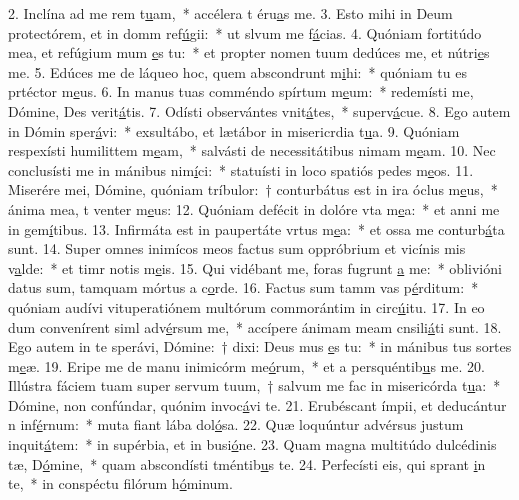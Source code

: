 2. Inclína ad me rem t\uline{u}am,~* accélera t éru\uline{a}s me.
3. Esto mihi in Deum protectórem, et in domm ref\uline{ú}gii:~* ut slvum me f\uline{á}cias.
4. Quóniam fortitúdo mea, et refúgium mum \uline{e}s tu:~* et propter nomen tuum dedúces me, et nútri\uline{e}s me.
5. Edúces me de láqueo hoc, quem abscondrunt m\uline{i}hi:~* quóniam tu es prtéctor m\uline{e}us.
6. In manus tuas comméndo spírtum m\uline{e}um:~* redemísti me, Dómine, Des verit\uline{á}tis.
7. Odísti observántes vnit\uline{á}tes,~* superv\uline{á}cue.
8. Ego autem in Dómin sper\uline{á}vi:~* exsultábo, et lætábor in misericrdia t\uline{u}a.
9. Quóniam respexísti humilittem m\uline{e}am,~* salvásti de necessitátibus nimam m\uline{e}am.
10. Nec conclusísti me in mánibus nim\uline{í}ci:~* statuísti in loco spatiós pedes m\uline{e}os.
11. Miserére mei, Dómine, quóniam tríbulor:~† conturbátus est in ira óclus m\uline{e}us,~* ánima mea, t venter m\uline{e}us:
12. Quóniam defécit in dolóre vta m\uline{e}a:~* et anni me in gem\uline{í}tibus.
13. Infirmáta est in paupertáte vrtus m\uline{e}a:~* et ossa me conturb\uline{á}ta sunt.
14. Super omnes inimícos meos factus sum oppróbrium et vicínis mis v\uline{a}lde:~* et timr notis m\uline{e}is.
15. Qui vidébant me, foras fugrunt \uline{a} me:~* oblivióni datus sum, tamquam mórtus a c\uline{o}rde.
16. Factus sum tamm vas p\uline{é}rditum:~* quóniam audívi vituperatiónem multórum commorántim in circ\uline{ú}itu.
17. In eo dum convenírent siml adv\uline{é}rsum me,~* accípere ánimam meam cnsili\uline{á}ti sunt.
18. Ego autem in te sperávi, Dómine:~† dixi: Deus mus \uline{e}s tu:~* in mánibus tus sortes m\uline{e}æ.
19. Eripe me de manu inimicórm me\uline{ó}rum,~* et a persquéntib\uline{u}s me.
20. Illústra fáciem tuam super servum tuum,~† salvum me fac in misericórda t\uline{u}a:~* Dómine, non confúndar, quónim invoc\uline{á}vi te.
21. Erubéscant ímpii, et deducántur n inf\uline{é}rnum:~* muta fiant lába dol\uline{ó}sa.
22. Quæ loquúntur advérsus justum inquit\uline{á}tem:~* in supérbia, et in busi\uline{ó}ne.
23. Quam magna multitúdo dulcédinis tæ, D\uline{ó}mine,~* quam abscondísti tméntib\uline{u}s te.
24. Perfecísti eis, qui sprant \uline{i}n te,~* in conspéctu filórum h\uline{ó}minum.

